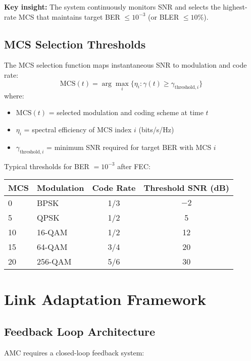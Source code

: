 \textbf{Key insight:} The system continuously monitors SNR and selects the highest-rate MCS that maintains target BER $\leq 10^{-3}$ (or BLER $\leq 10\%$).

\subsection{MCS Selection Thresholds}

The MCS selection function maps instantaneous SNR to modulation and code rate:
\begin{equation}
\text{MCS}(t) = \arg\max_i \{\eta_i : \gamma(t) \geq \gamma_{\text{threshold},i}\}
\end{equation}
where:
\begin{itemize}
\item $\text{MCS}(t)$ = selected modulation and coding scheme at time $t$
\item $\eta_i$ = spectral efficiency of MCS index $i$ (bits/s/Hz)
\item $\gamma_{\text{threshold},i}$ = minimum SNR required for target BER with MCS $i$
\end{itemize}

Typical thresholds for BER $= 10^{-3}$ after FEC:

\begin{center}
\begin{tabular}{@{}llcc@{}}
\toprule
\textbf{MCS} & \textbf{Modulation} & \textbf{Code Rate} & \textbf{Threshold SNR (dB)} \\
\midrule
0 & BPSK & 1/3 & $-2$ \\
5 & QPSK & 1/2 & 5 \\
10 & 16-QAM & 1/2 & 12 \\
15 & 64-QAM & 3/4 & 20 \\
20 & 256-QAM & 5/6 & 30 \\
\bottomrule
\end{tabular}
\end{center}

\section{Link Adaptation Framework}

\subsection{Feedback Loop Architecture}

AMC requires a closed-loop feedback system:

